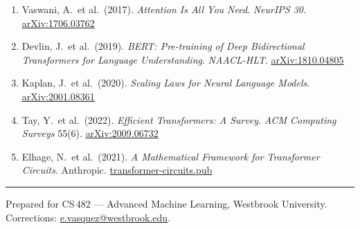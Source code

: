 \documentclass[11pt,a4paper]{article}
\begin{document}
\begin{enumerate}[label=\textcolor{accent}{\arabic*.}]
  \item Vaswani, A.\ et al.\ (2017). \textit{Attention Is All You Need}.
        \textit{NeurIPS 30}.
        \href{https://arxiv.org/abs/1706.03762}{arXiv:1706.03762}

  \item Devlin, J.\ et al.\ (2019). \textit{BERT: Pre-training of Deep Bidirectional
        Transformers for Language Understanding}. \textit{NAACL-HLT}.
        \href{https://arxiv.org/abs/1810.04805}{arXiv:1810.04805}

  \item Kaplan, J.\ et al.\ (2020). \textit{Scaling Laws for Neural Language Models}.
        \href{https://arxiv.org/abs/2001.08361}{arXiv:2001.08361}

  \item Tay, Y.\ et al.\ (2022). \textit{Efficient Transformers: A Survey}.
        \textit{ACM Computing Surveys} 55(6).
        \href{https://arxiv.org/abs/2009.06732}{arXiv:2009.06732}

  \item Elhage, N.\ et al.\ (2021). \textit{A Mathematical Framework for
        Transformer Circuits}. Anthropic.
        \href{https://transformer-circuits.pub/2021/framework/index.html}{transformer-circuits.pub}
\end{enumerate}

\vspace{6pt}
{\color{rulecol}\rule{\linewidth}{0.4pt}}
{\footnotesize\color{neutral!70}%
  \faInfoCircle\enspace
  Prepared for CS\,482 — Advanced Machine Learning,
  Westbrook University. Corrections: \href{mailto:e.vasquez@westbrook.edu}{e.vasquez@westbrook.edu}.%
}
\end{document}
